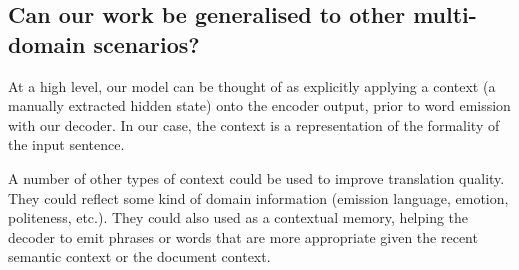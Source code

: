\documentclass[11pt]{article}
\begin{document}
\subsection{Can our work be generalised to other multi-domain scenarios?}

At a high level, our model can be thought of as explicitly applying a context (a manually extracted hidden state) onto the encoder output, prior to word emission with our decoder. In our case, the context is a representation of the formality of the input sentence.

A number of other types of context could be used to improve translation quality. They could reflect some kind of domain information (emission language, emotion, politeness, etc.). They could also used as a contextual memory, helping the decoder to emit phrases or words that are more appropriate given the recent semantic context or the document context.

\newpage
\printbibliography
\end{document}
